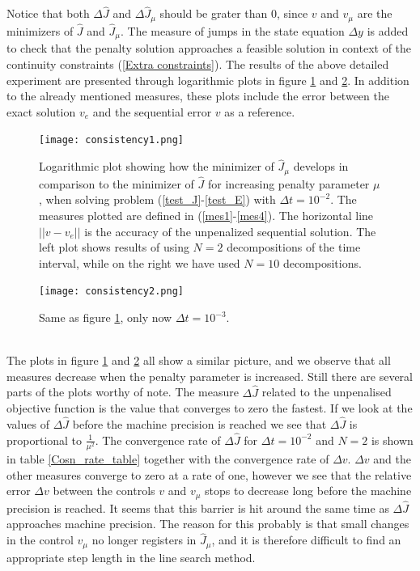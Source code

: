 Notice that both $\Delta\hat J$ and $\Delta \hat J_{\mu}$ should be grater than $0$, since $v$ and $v_{\mu}$ are the minimizers of $\hat J$ and $\hat J_ {\mu}$. The measure of jumps in the state equation $\Delta y$ is added to check that the penalty solution approaches a feasible solution in context of the continuity constraints (\ref{Extra constraints}). The results of the above detailed experiment are presented through logarithmic plots in figure \ref{Cons1_fig} and \ref{Cons2_fig}. In addition to the already mentioned measures, these plots include the error between the exact solution $v_e$ and the sequential error $v$ as a reference.
\\
\begin{figure}[!h]
\centering
\texttt{[image: consistency1.png]}
\caption{Logarithmic plot showing how the minimizer of $\hat J_{\mu}$ develops in comparison to the minimizer of $\hat J$ for increasing penalty parameter $\mu$, when solving problem (\ref{test_J}-\ref{test_E}) with $\Delta t = 10^{-2}$. The measures plotted are defined in (\ref{mes1}-\ref{mes4}). The horizontal line $||v-v_e||$ is the accuracy of the unpenalized sequential solution. The left plot shows results of using $N=2$ decompositions of the time interval, while on the right we have used $N=10$ decompositions.}
\label{Cons1_fig}
\end{figure}
\noindent
\begin{figure}[!h]
\centering
\texttt{[image: consistency2.png]}
\caption{Same as figure \ref{Cons1_fig}, only now $\Delta t = 10^{-3}$.}
\label{Cons2_fig}
\end{figure}
\noindent
\\
The plots in figure \ref{Cons1_fig} and \ref{Cons2_fig} all show a similar picture, and we observe that all measures decrease when the penalty parameter is increased. Still there are several parts of the plots worthy of note. The measure $\Delta\hat J$ related to the unpenalised objective function is the value that converges to zero the fastest. If we look at the values of $\Delta\hat J$ before the machine precision is reached we see that $\Delta \hat J$ is proportional to $\frac{1}{\mu^2}$. The convergence rate of $\Delta\hat J$ for $\Delta t=10^{-2}$ and $N=2$ is shown in table \ref{Cosn_rate_table} together with the convergence rate of $\Delta v$. $\Delta v$ and the other measures converge to zero at a rate of one, however we see that the relative error $\Delta v$ between the controls $v$ and $v_{\mu}$ stops to decrease long before the machine precision is reached. It seems that this barrier is hit around the same time as $\Delta\hat J$ approaches machine precision. The reason for this probably is that small changes in the control $v_{\mu}$ no longer registers in $\hat J_{\mu}$, and it is therefore difficult to find an appropriate step length in the line search method.
